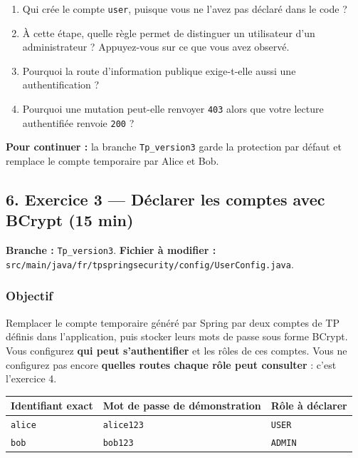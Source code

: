 \documentclass[
  french,
  10pt,
  a4paper,
]{article}
\newcounter{none} %
\providecommand{\tightlist}{%
  \setlength{\itemsep}{0pt}\setlength{\parskip}{0pt}}
\begin{document}
\begin{enumerate}
\def\labelenumi{\arabic{enumi}.}
\tightlist
\item
  Qui crée le compte \texttt{user}, puisque vous ne l'avez pas déclaré
  dans le code ?
\item
  À cette étape, quelle règle permet de distinguer un utilisateur d'un
  administrateur ? Appuyez-vous sur ce que vous avez observé.
\item
  Pourquoi la route d'information publique exige-t-elle aussi une
  authentification ?
\item
  Pourquoi une mutation peut-elle renvoyer \texttt{403} alors que votre
  lecture authentifiée renvoie \texttt{200} ?
\end{enumerate}

\textbf{Pour continuer :} la branche \texttt{Tp\_version3} garde la
protection par défaut et remplace le compte temporaire par Alice et Bob.

\subsection{6. Exercice 3 --- Déclarer les comptes avec BCrypt (15
min)}\label{exercice-3-duxe9clarer-les-comptes-avec-bcrypt-15-min}

\textbf{Branche :} \texttt{Tp\_version3}. \textbf{Fichier à modifier :}
\texttt{src/main/java/fr/tpspringsecurity/config/UserConfig.java}.

\subsubsection{Objectif}\label{objectif-1}

Remplacer le compte temporaire généré par Spring par deux comptes de TP
définis dans l'application, puis stocker leurs mots de passe sous forme
BCrypt. Vous configurez \textbf{qui peut s'authentifier} et les rôles de
ces comptes. Vous ne configurez pas encore \textbf{quelles routes chaque
rôle peut consulter} : c'est l'exercice 4.

{\def\LTcaptype{none} %
\begin{longtable}[]{@{}lll@{}}
\toprule\noalign{}
Identifiant exact & Mot de passe de démonstration & Rôle à déclarer \\
\midrule\noalign{}
\endhead
\bottomrule\noalign{}
\endlastfoot
\texttt{alice} & \texttt{alice123} & \texttt{USER} \\
\texttt{bob} & \texttt{bob123} & \texttt{ADMIN} \\
\end{longtable}
}
\end{document}
